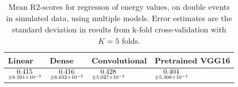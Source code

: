 \begin{table}
\centering
\caption{
Mean R2-scores for regresson of energy values, on double events in simulated data, using multiple models. 
Error estimates are the standard deviation in results from k-fold cross-validation 
with $K=5$ folds.
}
\label{tab:regression-simulated-double-energy-r2}
\begin{tabular}{llll}
\toprule
                                             Linear &                                               Dense &                                       Convolutional &                                    Pretrained VGG16 \\
\midrule
 $\underset{\num{+- 6.501e-02 }  }{\num{ 0.415 } }$ &  $\underset{\num{+- 6.632e-02 }  }{\num{ 0.416 } }$ &  $\underset{\num{+- 5.027e-02 }  }{\num{ 0.428 } }$ &  $\underset{\num{+- 5.308e-02 }  }{\num{ 0.404 } }$ \\
\bottomrule
\end{tabular}
\end{table}
